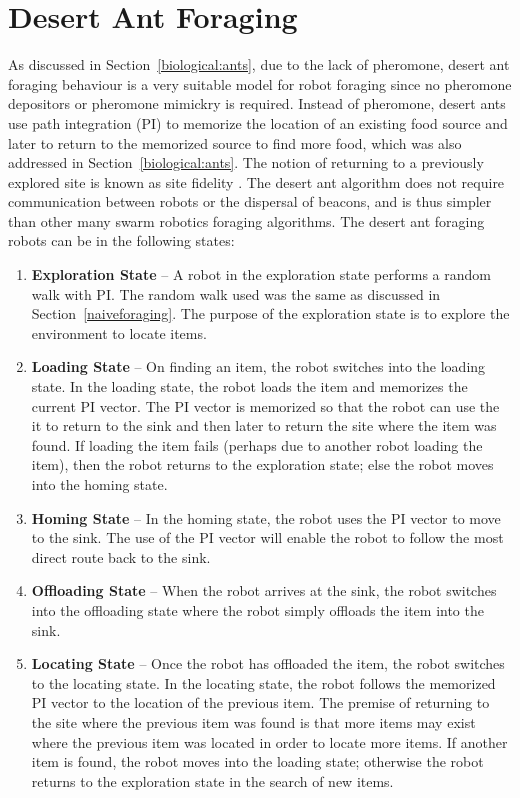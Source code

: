 \section{Desert Ant Foraging}
\label{desertantforaging}


As discussed in Section~\ref{biological:ants}, due to the lack of pheromone, desert ant foraging behaviour is a very suitable model for robot foraging since no pheromone depositors or pheromone mimickry is required. Instead of pheromone, desert ants use path integration (PI) to memorize the location of an existing food source and later to return to the memorized source to find more food, which was also addressed in Section~\ref{biological:ants}. The notion of returning to a previously explored site is known as site fidelity \cite{switzer1993site}. The desert ant algorithm does not require communication between robots or the dispersal of beacons, and is thus simpler than other many swarm robotics foraging algorithms. The desert ant foraging robots can be in the following states:

\begin{enumerate}
	\item\textbf{Exploration State} -- A robot in the exploration state performs a random walk with PI. The random walk used was the same as discussed in Section~\ref{naiveforaging}. The purpose of the exploration state is to explore the environment to locate items. 
	\item\textbf{Loading State} -- On finding an item, the robot switches into the loading state. In the loading state, the robot loads the item and memorizes the current PI vector. The PI vector is memorized so that the robot can use the it to return to the sink and then later to return the site where the item was found. If loading the item fails (perhaps due to another robot loading the item), then the robot returns to the exploration state; else the robot moves into the homing state.
	\item\textbf{Homing State} -- In the homing state, the robot uses the PI vector to move to the sink. The use of the PI vector will enable the robot to follow the most direct route back to the sink.
	\item\textbf{Offloading State} -- When the robot arrives at the sink, the robot switches into the offloading state where the robot simply offloads the item into the sink. 
	\item\textbf{Locating State} -- Once the robot has offloaded the item, the robot switches to the locating state. In the locating state, the robot follows the memorized PI vector to the location of the previous item. The premise of returning to the site where the previous item was found is that more items may exist where the previous item was located in order to locate more items. If another item is found, the robot moves into the loading state; otherwise the robot returns to the exploration state in the search of new items. 
\end{enumerate}

